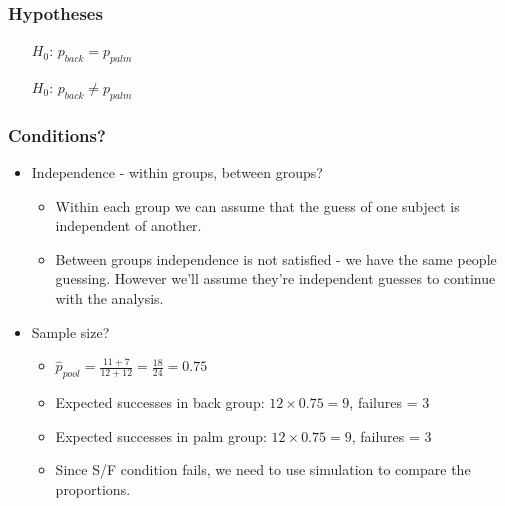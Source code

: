 
\begin{frame}
\frametitle{Hypotheses}


\begin{itemize}
\item[$H_0$:] $p_{back} = p_{palm}$
\item[$H_0$:] $p_{back} \ne p_{palm}$
\end{itemize}

\end{frame}


\begin{frame}
\frametitle{Conditions?}

\begin{itemize}

\item Independence - within groups, between groups?
\begin{itemize}
\item Within each group we can assume that the guess of one subject is independent of another.
\item Between groups independence is not satisfied - we have the same people guessing. However we'll assume they're independent guesses to continue with the analysis.
\end{itemize}

\item Sample size?
\begin{itemize}
\item $\hat{p}_{pool} = \frac{11 + 7}{12 + 12} = \frac{18}{24} = 0.75$
\item Expected successes in back group: $12 \times 0.75 = 9$, failures = 3
\item Expected successes in palm group: $12 \times 0.75 = 9$, failures = 3
\item Since S/F condition fails, we need to use simulation to compare the proportions.
\end{itemize}

\end{itemize}

\end{frame}


